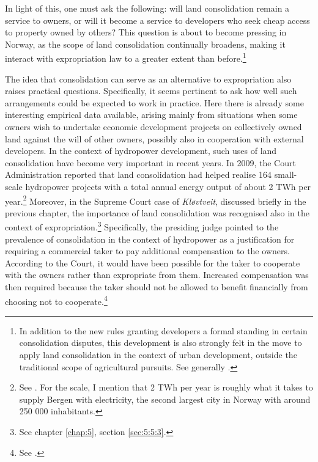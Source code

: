 In light of this, one must ask the following: will land consolidation remain a service to owners, or will it become a service to developers who seek cheap access to property owned by others? This question is about to become pressing in Norway, as the scope of land consolidation continually broadens, making it interact with expropriation law to a greater extent than before.\footnote{In addition to the new rules granting developers a formal standing in certain consolidation disputes, this development is also strongly felt in the move to apply land consolidation in the context of urban development, outside the traditional scope of agricultural pursuits. See generally \cite{stenseth07}.}


The idea that consolidation can serve as an alternative to expropriation also raises practical questions. Specifically, it seems pertinent to ask how well such arrangements could be expected to work in practice. Here there is already some interesting empirical data available, arising mainly from situations when some owners wish to undertake economic development projects on collectively owned land against the will of other owners, possibly also in cooperation with external developers. In the context of hydropower development, such uses of land consolidation have become very important in recent years. In 2009, the Court Administration reported that land consolidation had helped realise 164 small-scale hydropower projects with a total annual energy output of about 2 TWh per year.\footnote{See \cite{gevinst09}. For the scale, I mention that 2 TWh per year is roughly what it takes to supply Bergen with electricity, the second largest city in Norway with around 250 000 inhabitants.} Moreover, in the Supreme Court case of {\it Kløvtveit}, discussed briefly in the previous chapter, the importance of land consolidation was recognised also in the context of expropriation.\footnote{See chapter \ref{chap:5}, section \ref{sec:5:5:3}.} Specifically, the presiding judge pointed to the prevalence of consolidation in the context of hydropower as a justification for requiring a commercial taker to pay additional compensation to the owners. According to the Court, it would have been possible for the taker to cooperate with the owners rather than expropriate from them. Increased compensation was then required because the taker should not be allowed to benefit financially from choosing not to cooperate.\footnote{See \cite{klovtveit11}.}

